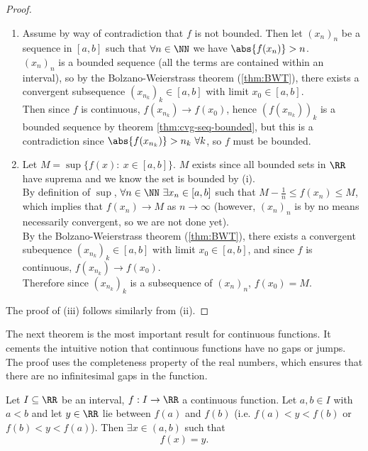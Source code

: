 \documentclass[../real_analysis.tex]{subfiles}
\begin{document}
            \begin{proof}
                \begin{enumerate}[label={\upshape(\roman*)}]
                    \item Assume by way of contradiction that $f$ is not bounded. Then let $(x_n)_n$ be a sequence in $[a,b]$ such that $\forall n\in\NN$ we have $\abs{f(x_n)}>n$.\\
                    $(x_n)_n$ is a bounded sequence (all the terms are contained within an interval), so by the Bolzano-Weierstrass theorem (\ref{thm:BWT}), there exists a convergent subsequence $(x_{n_k})_k\in[a,b]$ with limit $x_0\in[a,b]$.\\
                    Then since $f$ is continuous, $f(x_{n_k})\to f(x_0)$, hence $(f(x_{n_k}))_k$ is a bounded sequence by theorem \ref{thm:cvg-seq-bounded}, but this is a contradiction since $\abs{f(x_{n_k})}>n_k\ \forall k$, so $f$ must be bounded.
                    \item Let $M=\sup\{f(x):\ x\in[a,b]\}$. $M$ exists since all bounded sets in $\RR$ have suprema and we know the set is bounded by (i).\\
                    By definition of $\sup$, $\forall n\in\NN\ \exists x_n\in[a,b]$ such that $M-\frac{1}{n}\leq f(x_n)\leq M$, which implies that $f(x_n)\to M$ as $n\to\infty$ (however, $(x_n)_n$ is by no means necessarily convergent, so we are not done yet).\\
                    By the Bolzano-Weierstrass theorem (\ref{thm:BWT}), there exists a convergent subequence $(x_{n_k})_k\in[a,b]$ with limit $x_0\in[a,b]$, and since $f$ is continuous, $f(x_{n_k})\to f(x_0)$.\\
                    Therefore since $(x_{n_k})_k$ is a subsequence of $(x_n)_n$, $f(x_0)=M$.
                \end{enumerate}
                The proof of (iii) follows similarly from (ii).
            \end{proof}
            The next theorem is the most important result for continuous functions. It cements the intuitive notion that continuous functions have no gaps or jumps. The proof uses the completeness property of the real numbers, which ensures that there are no infinitesimal gaps in the function.
            \begin{theorem}\label{thm:ivt}
                Let $I\subseteq\RR$ be an interval, $f: I\to\RR$ a continuous function. Let $a,b\in I$ with $a<b$ and let $y\in\RR$ lie between $f(a)$ and $f(b)$ (i.e. $f(a)<y<f(b)$ or $f(b)<y<f(a)$). Then $\exists x\in(a,b)$ such that
                \begin{equation}
                    f(x)=y.
                \end{equation}
            \end{theorem}
\end{document}
